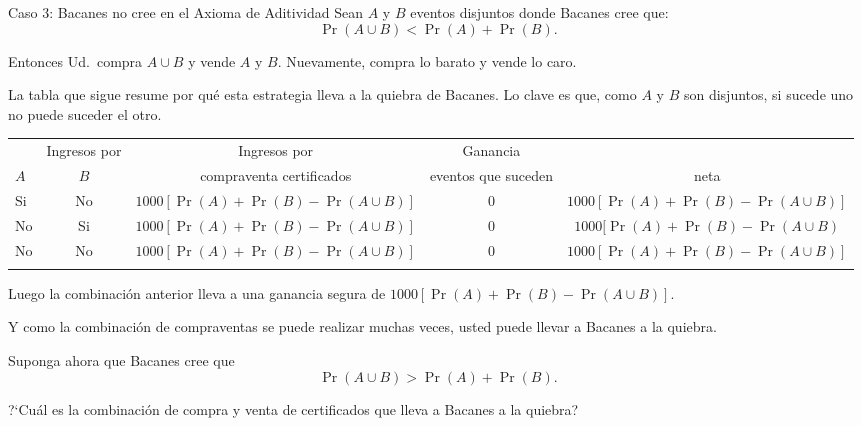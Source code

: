 \documentclass[9pt,handout]{beamer}
\begin{document}

\begin{frame}{Caso 3: Bacanes no cree en el Axioma de Aditividad}
Sean $A$ y $B$ eventos disjuntos donde Bacanes cree que:
\[
\Pr(A\cup B) < \Pr(A) + \Pr(B). 
\]

\bigskip 

Entonces Ud.\ compra $A\cup B$ y vende
$A$ y $B$. Nuevamente, compra lo barato y vende lo caro.

\bigskip

La tabla que sigue resume por qué esta estrategia lleva a la quiebra de Bacanes. 
Lo clave es que, como $A$ y $B$ son disjuntos, si sucede uno no puede suceder el otro.

\begin{center}
\begin{tabular}{l cccc}
\resizebox{\textwidth}{!}{
\toprule
\multicolumn{2}{c}{Eventos que suceden}  & Ingresos      por                        & Ingresos        por              & Ganancia         \\
$A$  & $B$                                       & compraventa certificados   & eventos que suceden  & neta      \\
\midrule
Si    & No                                                   & $1000[\Pr(A)+\Pr(B)-\Pr(A\cup B)]$ & 0  & $1000[\Pr(A)+\Pr(B) - \Pr(A\cup B)]$\\
No   & Si                                                  &   $1000[\Pr(A)+\Pr(B)-\Pr(A\cup B)]$ & 0  & $1000[\Pr(A)+\Pr(B) - \Pr(A\cup B)$\\ 
No   & No                                                   & $1000[\Pr(A)+\Pr(B)-\Pr(A\cup B)]$ & 0 &  $1000[\Pr(A)+\Pr(B) - \Pr(A\cup B)]$\\
\bottomrule
}
\end{tabular}
\end{center}
\end{frame}


\begin{frame}{}

Luego la combinación anterior lleva a una ganancia segura de 
 $1000[\Pr(A)+\Pr(B) - \Pr(A\cup B)]$. 
 
 \bigskip
 
 Y como la combinación de compraventas se puede realizar
 muchas veces, usted puede llevar a Bacanes a la quiebra. 
 
 \bigskip
 
 Suponga ahora que Bacanes cree que
 \[
\Pr(A\cup B) > \Pr(A) + \Pr(B). 
\]

\bigskip

?`Cuál es la combinación de compra y venta de certificados
que lleva a Bacanes a la quiebra?
\end{frame}
\end{document}
